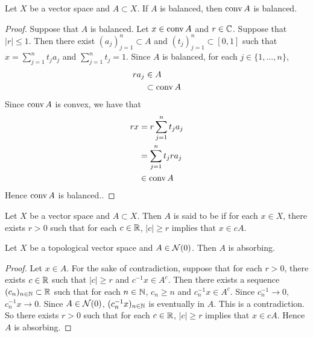 \documentclass{book}
\begin{document}
	\begin{ex}
		Let $X$ be a vector space and $A \subset X$. If $A$ is balanced, then $\operatorname{conv} A$ is balanced.
	\end{ex}

	\begin{proof}
		Suppose that $A$ is balanced. Let $x \in \operatorname{conv} A$ and $r \in \mathbb{C}$. Suppose that $|r| \leq 1$. Then there exist $(a_j)_{j=1}^n \subset A$ and $(t_j)_{j=1}^n \subset [0,1]$ such that $x = \sum\limits_{j=1}^n t_j a_j$ and $\sum\limits_{j=1}^n t_j = 1$. Since $A$ is balanced, for each $j \in \{1, \ldots, n\}$, 
		\begin{align*}
			ra_j 
			&\in A \\
			&\subset \operatorname{conv} A
		\end{align*}
		Since $\operatorname{conv} A$ is convex, we have that 
		\begin{align*}
			rx 
			&= r\sum\limits_{j=1}^n t_j a_j\\
			&= \sum\limits_{j=1}^n t_j ra_j\\
			&\in \operatorname{conv} A
		\end{align*}
		Hence $\operatorname{conv} A$ is balanced..
	\end{proof}



	\begin{defn}
		Let $X$ be a vector space and $A \subset X$. Then $A$ is said to be  if for each $x \in X$, there exists $r > 0$ such that for each $c \in \mathbb{R}$, $|c| \geq r$ implies that $x \in cA$.
	\end{defn}

	\begin{ex}
		Let $X$ be a topological vector space and $A \in \mathcal{N}(0)$. Then $A$ is absorbing. 
	\end{ex}

	\begin{proof}
		Let $x \in A$. For the sake of contradiction, suppose that for each $r > 0$, there exists $c \in \mathbb{R}$ such that $|c| \geq r$ and $c^{-1}x \in A^c$. Then there exists a sequence $(c_{n})_{n \in \mathbb{N}} \subset \mathbb{R}$ such that for each $n \in \mathbb{N}$, $c_n \geq n$ and $c_n^{-1}x \in A^c$. Since $c_n^{-1} \rightarrow 0$, $c_n^{-1}x \rightarrow 0$. Since $A \in \mathcal{N}(0)$, $(c_n^{-1}x)_{n \in \mathbb{N}}$ is eventually in $A$. This is a contradiction. So there exists $r > 0$ such that for each $c \in \mathbb{R}$, $|c| \geq r$ implies that $x \in cA$. Hence $A$ is absorbing.
	\end{proof}

	\begin{ex}
		
	\end{ex}
	
\end{document}
